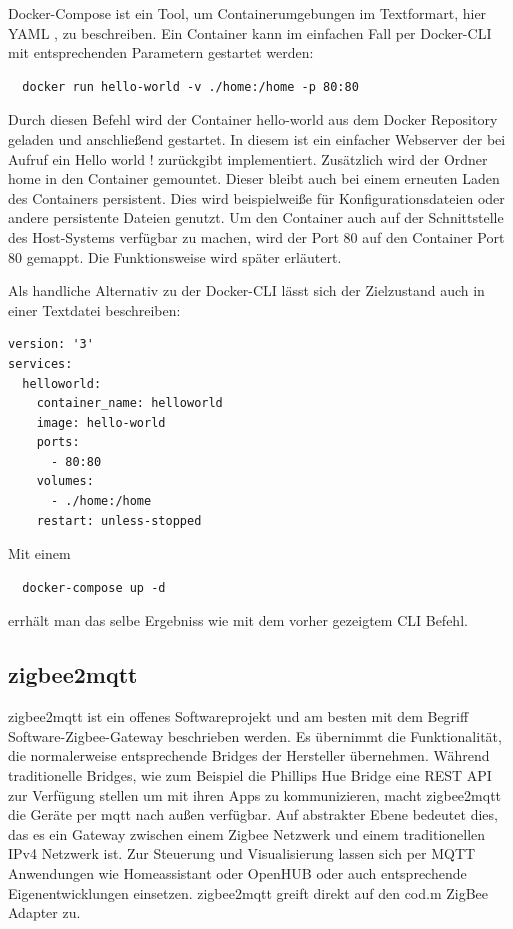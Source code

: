 Docker-Compose ist ein Tool, um Containerumgebungen im Textformart, hier \grqq YAML \grqq{}, zu beschreiben.
Ein Container kann im einfachen Fall per Docker-CLI mit entsprechenden Parametern gestartet werden:
\begin{lstlisting}
  docker run hello-world -v ./home:/home -p 80:80
\end{lstlisting}

Durch diesen Befehl wird der Container \grqq hello-world \grqq aus dem Docker Repository geladen und anschließend gestartet. In diesem ist ein einfacher Webserver der bei
Aufruf ein \grqq Hello world ! \grqq{} zurückgibt implementiert. Zusätzlich wird der Ordner \grqq home \grqq{} in den Container gemountet. Dieser bleibt auch bei einem
erneuten Laden des Containers persistent. Dies wird beispielweiße für Konfigurationsdateien oder andere persistente Dateien genutzt. Um den Container auch auf der Schnittstelle
des Host-Systems verfügbar zu machen, wird der Port 80 auf den Container Port 80 gemappt. Die Funktionsweise wird später erläutert.

Als handliche Alternativ zu der Docker-CLI lässt sich der Zielzustand auch in einer Textdatei beschreiben:

\begin{lstlisting}
version: '3'
services:
  helloworld:
    container_name: helloworld
    image: hello-world
    ports:
      - 80:80
    volumes:
      - ./home:/home
    restart: unless-stopped
\end{lstlisting}

Mit einem 
\begin{lstlisting}
  docker-compose up -d
\end{lstlisting}

errhält man das selbe Ergebniss wie mit dem vorher gezeigtem CLI Befehl.

\subsection{zigbee2mqtt}

zigbee2mqtt ist ein offenes Softwareprojekt und am besten mit dem Begriff \grqq Software-Zigbee-Gateway\grqq{} beschrieben werden. Es übernimmt die Funktionalität, die normalerweise entsprechende
Bridges der Hersteller übernehmen. Während traditionelle Bridges, wie zum Beispiel die Phillips Hue Bridge eine REST API zur Verfügung stellen um mit ihren
Apps zu kommunizieren, macht zigbee2mqtt die Geräte per mqtt nach außen verfügbar. Auf abstrakter Ebene bedeutet dies, das es ein Gateway zwischen einem Zigbee Netzwerk und
einem traditionellen IPv4 Netzwerk ist. Zur Steuerung und Visualisierung lassen sich per MQTT Anwendungen wie \grqq Homeassistant\grqq{} oder \grqq OpenHUB\grqq{} oder auch entsprechende
Eigenentwicklungen einsetzen. \grqq zigbee2mqtt\grqq{} greift direkt auf den \grqq cod.m\grqq{} ZigBee Adapter zu.

